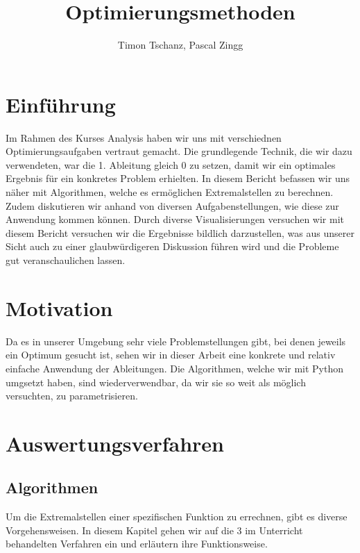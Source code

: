 \documentclass[10pt]{article}         %
\title{Optimierungsmethoden}
\author{Timon Tschanz, Pascal Zingg}
\begin{document}



\maketitle

\section{Einführung}
Im Rahmen des Kurses Analysis haben wir uns mit verschiednen Optimierungsaufgaben vertraut gemacht. Die grundlegende Technik, die wir dazu verwendeten, war die 1. Ableitung gleich 0 zu setzen, damit wir ein optimales Ergebnis für ein konkretes Problem erhielten. In diesem Bericht befassen wir uns näher mit Algorithmen, welche es ermöglichen Extremalstellen zu berechnen. Zudem diskutieren wir anhand von diversen Aufgabenstellungen, wie diese zur Anwendung kommen können. Durch diverse Visualisierungen versuchen wir mit diesem Bericht versuchen wir die Ergebnisse bildlich darzustellen, was aus unserer Sicht auch zu einer glaubwürdigeren Diskussion führen wird und die Probleme gut veranschaulichen lassen.

\section{Motivation}
Da es in unserer Umgebung sehr viele Problemstellungen gibt, bei denen jeweils ein Optimum gesucht ist, sehen wir in dieser Arbeit eine konkrete und relativ einfache Anwendung der Ableitungen. Die Algorithmen, welche wir mit Python umgsetzt haben, sind wiederverwendbar, da wir sie so weit als möglich versuchten, zu parametrisieren. 

\pagebreak
\section{Auswertungsverfahren}
\subsection{Algorithmen}
Um die Extremalstellen einer spezifischen Funktion zu errechnen, gibt es diverse Vorgehensweisen. In diesem Kapitel gehen wir auf die 3 im Unterricht behandelten Verfahren ein und erläutern ihre Funktionsweise. 
\end{document}

